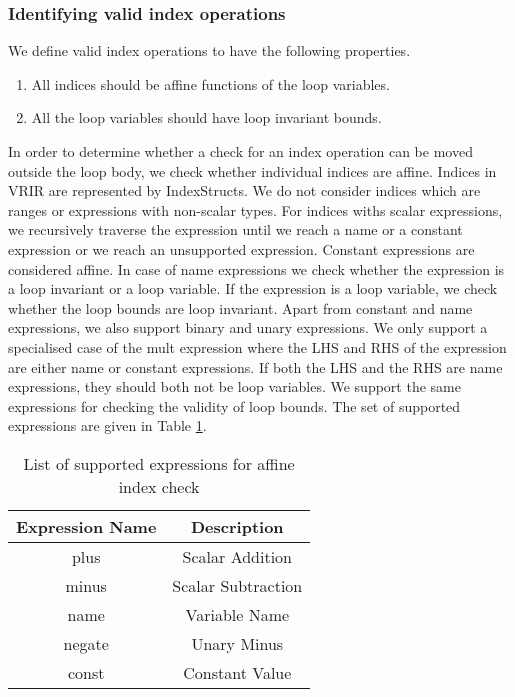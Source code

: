 \subsubsection{Identifying valid index operations}
We define valid index operations to have the following properties. 
\begin{enumerate}
\item All indices should be affine functions of the loop variables. 
\item All the loop variables should have loop invariant bounds. 
\end{enumerate}
In order to determine whether a check for an index operation can be moved outside the loop body, we check whether individual indices are affine. Indices in VRIR are represented by IndexStructs. We do not consider indices which are ranges or expressions with non-scalar types. For indices withs scalar expressions, we recursively traverse the expression until we reach a name or a constant expression or we reach an unsupported expression. Constant expressions are considered affine. In  case of name expressions we check whether the expression is a loop invariant or a loop variable. If the expression is a loop variable, we check whether the loop bounds are loop invariant. Apart from constant and name expressions, we also support binary and unary expressions. We only support a specialised case of the mult expression where the LHS and RHS  of the expression are either name or constant expressions. If both the LHS and the RHS are name expressions, they should both not be loop variables. We support the same expressions for checking the validity of loop bounds. The set of supported expressions are given in Table \ref{tab:affineIndexCheck}. 
\begin{table}[htbp]
\centering
\begin{tabular}{|c|c|}
\hline
Expression Name & Description        \\ \hline
plus            & Scalar Addition    \\ \hline
minus           & Scalar Subtraction \\ \hline
name            & Variable Name      \\ \hline
negate          & Unary Minus        \\ \hline
const           & Constant Value     \\ \hline
\end{tabular}
\caption{List of supported expressions for affine index check}
\label{tab:affineIndexCheck}
\end{table} 
